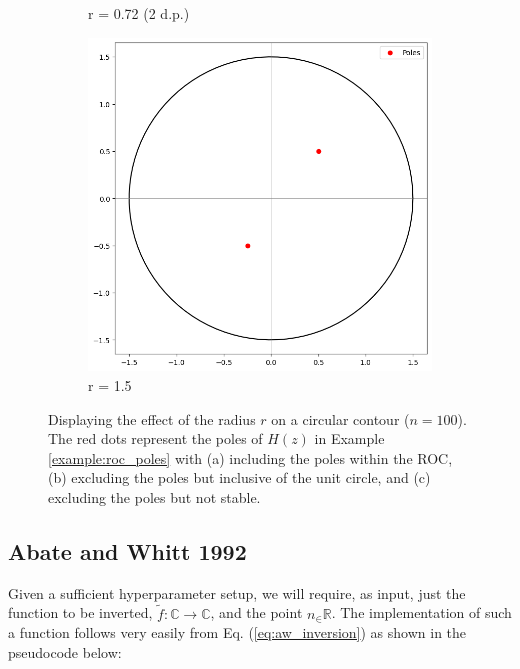 \documentclass[a4paper]{report}
\begin{document}
\begin{figure}[H]
\begin{subfigure}{.25\linewidth}
      \caption{r = 0.72 (2 d.p.)}
      \label{fig:valid_r}
    \end{subfigure}\hfill
    \begin{subfigure}{.25\linewidth}
      \includegraphics[width=\linewidth]{images/unstable_contour.png}
      \caption{r = 1.5}
    \end{subfigure}\hfill
    
    \caption{ Displaying the effect of the radius $r$ on a circular contour ($n = 100$). The red dots represent the poles of $H(z)$ in Example \ref{example:roc_poles} with (a) including the poles within the ROC, (b) excluding the poles but inclusive of the unit circle, and (c) excluding the poles but not stable.}
    \label{fig:effect_r}
\end{figure}

\subsection{Abate and Whitt 1992}\label{sec:experiment_aw}
Given a sufficient hyperparameter setup, we will require, as input,  just the function to be inverted, $\tilde{f}: \mathbb{C}\rightarrow \mathbb{C}$, and the point $n_\in \mathbb{R}$. The implementation of such a function follows very easily from Eq. (\ref{eq:aw_inversion}) as shown in the pseudocode below:
\end{document}

